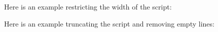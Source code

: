 \documentclass{article}
\begin{document}
Here is an example restricting the width of the script:


Here is an example truncating the script and removing empty lines:

\end{document}
